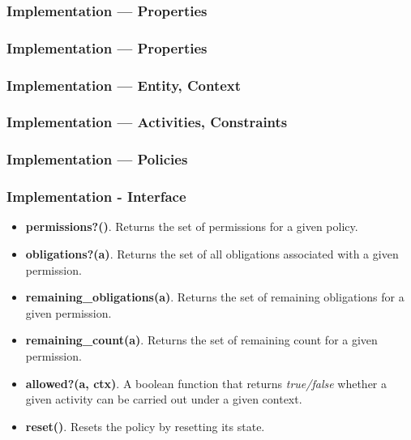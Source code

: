 \documentclass[t, xcolor=dvipsnames, handout, 10pt]{beamer}
\begin{document}
\begin{frame}[t]
\frametitle{Implementation --- Properties}

\end{frame}

\begin{frame}[t]
\frametitle{Implementation --- Properties}

\end{frame}

\begin{frame}[t]
\frametitle{Implementation --- Entity, Context}

\pause

\end{frame}

\begin{frame}[t]
\frametitle{Implementation --- Activities, Constraints}

\pause

\end{frame}


\begin{frame}[t]
\frametitle{Implementation --- Policies}

\pause

\end{frame}

\begin{frame}[t]
\frametitle{Implementation - Interface}
\begin{itemize}
\item<2-> {\bf permissions?()}. Returns the set of permissions for a given policy.
\item<3-> {\bf obligations?(a)}. Returns the set of all obligations associated with a given permission. 
\item<4-> {\bf remaining\_obligations(a)}. Returns the set of remaining obligations for a given permission. 
\item<5-> {\bf remaining\_count(a)}. Returns the set of remaining count for a given permission. 
\item<6-> {\bf allowed?(a, ctx)}. A boolean function that returns {\em true/false} whether a given activity can be carried out under a given context. 
\item<7-> {\bf reset()}. Resets the policy by resetting its state. 
\end{itemize}
\end{frame}
\end{document}
